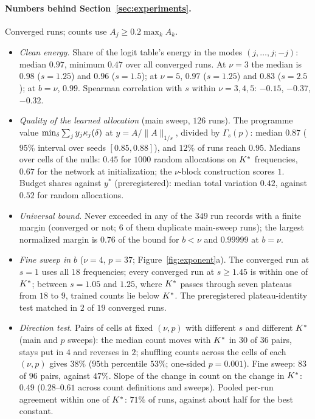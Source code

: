\paragraph{Numbers behind Section~\ref{sec:experiments}.} Converged runs; counts use $A_j\ge0.2\max_kA_k$. 
\begin{itemize}
\item \emph{Clean energy.} Share of the logit table's energy in the modes $(j,\dots,j;-j)$: median $0.97$, minimum $0.47$ over all converged runs. At $\nu=3$ the median is $0.98$ ($s=1.25$) and $0.96$ ($s=1.5$); at $\nu=5$, $0.97$ ($s=1.25$) and $0.83$ ($s=2.5$); at $b=\nu$, $0.99$. Spearman correlation with $s$ within $\nu=3,4,5$: $-0.15$, $-0.37$, $-0.32$.
\item \emph{Quality of the learned allocation} (main sweep, $126$ runs). The programme value $\min_\delta\sum_jy_j\kappa_{j}(\delta)$ at $y=A/\|A\|_{1/s}$, divided by $\Gamma_s(p)$: median $0.87$ ($95\%$ interval over seeds $[0.85,0.88]$), and $12\%$ of runs reach $0.95$. Medians over cells of the nulls: $0.45$ for $1000$ random allocations on $K^{*}$ frequencies, $0.67$ for the network at initialization; the $\nu$-block construction scores $1$. Budget shares against $y^*$ (preregistered): median total variation $0.42$, against $0.52$ for random allocations.
\item \emph{Universal bound.} Never exceeded in any of the $349$ run records with a finite margin (converged or not; $6$ of them duplicate main-sweep runs); the largest normalized margin is $0.76$ of the bound for $b<\nu$ and $0.99999$ at $b=\nu$.
\item \emph{Fine sweep in $b$} ($\nu=4$, $p=37$; Figure~\ref{fig:exponent}a). The converged run at $s=1$ uses all $18$ frequencies; every converged run at $s\ge1.45$ is within one of $K^{*}$; between $s=1.05$ and $1.25$, where $K^{*}$ passes through seven plateaus from $18$ to $9$, trained counts lie below $K^{*}$. The preregistered plateau-identity test matched in $2$ of $19$ converged runs.
\item \emph{Direction test}. Pairs of cells at fixed $(\nu,p)$ with different $s$ and different $K^{*}$ (main and $p$ sweeps): the median count moves with $K^{*}$ in $30$ of $36$ pairs, stays put in $4$ and reverses in $2$; shuffling counts across the cells of each $(\nu,p)$ gives $38\%$ ($95$th percentile $53\%$; one-sided $p=0.001$). Fine sweep: $83$ of $96$ pairs, against $47\%$. Slope of the change in count on the change in $K^{*}$: $0.49$ ($0.28$--$0.61$ across count definitions and sweeps). Pooled per-run agreement within one of $K^{*}$: $71\%$ of runs, against about half for the best constant.

\end{itemize}
